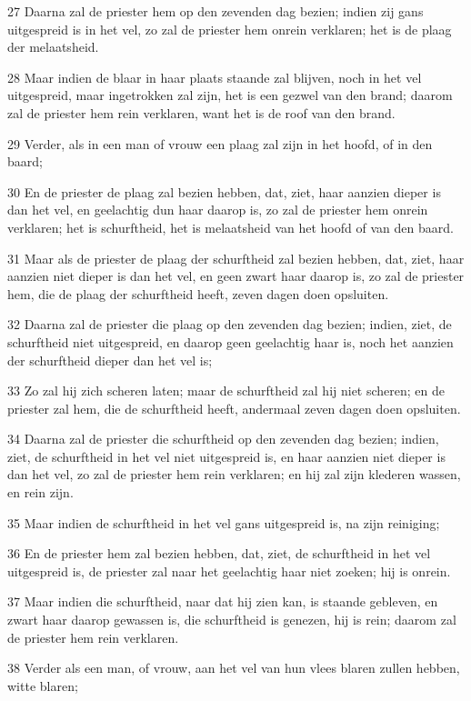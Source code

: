 \par 27 Daarna zal de priester hem op den zevenden dag bezien; indien zij gans uitgespreid is in het vel, zo zal de priester hem onrein verklaren; het is de plaag der melaatsheid.
\par 28 Maar indien de blaar in haar plaats staande zal blijven, noch in het vel uitgespreid, maar ingetrokken zal zijn, het is een gezwel van den brand; daarom zal de priester hem rein verklaren, want het is de roof van den brand.
\par 29 Verder, als in een man of vrouw een plaag zal zijn in het hoofd, of in den baard;
\par 30 En de priester de plaag zal bezien hebben, dat, ziet, haar aanzien dieper is dan het vel, en geelachtig dun haar daarop is, zo zal de priester hem onrein verklaren; het is schurftheid, het is melaatsheid van het hoofd of van den baard.
\par 31 Maar als de priester de plaag der schurftheid zal bezien hebben, dat, ziet, haar aanzien niet dieper is dan het vel, en geen zwart haar daarop is, zo zal de priester hem, die de plaag der schurftheid heeft, zeven dagen doen opsluiten.
\par 32 Daarna zal de priester die plaag op den zevenden dag bezien; indien, ziet, de schurftheid niet uitgespreid, en daarop geen geelachtig haar is, noch het aanzien der schurftheid dieper dan het vel is;
\par 33 Zo zal hij zich scheren laten; maar de schurftheid zal hij niet scheren; en de priester zal hem, die de schurftheid heeft, andermaal zeven dagen doen opsluiten.
\par 34 Daarna zal de priester die schurftheid op den zevenden dag bezien; indien, ziet, de schurftheid in het vel niet uitgespreid is, en haar aanzien niet dieper is dan het vel, zo zal de priester hem rein verklaren; en hij zal zijn klederen wassen, en rein zijn.
\par 35 Maar indien de schurftheid in het vel gans uitgespreid is, na zijn reiniging;
\par 36 En de priester hem zal bezien hebben, dat, ziet, de schurftheid in het vel uitgespreid is, de priester zal naar het geelachtig haar niet zoeken; hij is onrein.
\par 37 Maar indien die schurftheid, naar dat hij zien kan, is staande gebleven, en zwart haar daarop gewassen is, die schurftheid is genezen, hij is rein; daarom zal de priester hem rein verklaren.
\par 38 Verder als een man, of vrouw, aan het vel van hun vlees blaren zullen hebben, witte blaren;
